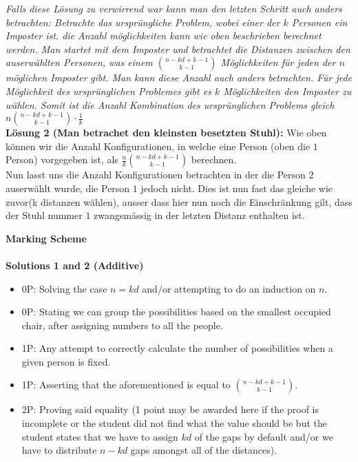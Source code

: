 {\emph{Falls diese Lösung zu verwirrend war kann man den letzten Schritt auch anders betrachten: Betrachte das ursprüngliche Problem, wobei einer der $k$ Personen ein Imposter ist. die Anzahl möglichkeiten kann wie oben beschrieben berechnet werden. Man startet mit dem Imposter und betrachtet die Distanzen zwischen den auserwählten Personen, was einem $\binom{n-kd+k-1}{k-1}$ Möglichkeiten für  jeden der $n$ möglichen Imposter gibt. Man kann diese Anzahl auch anders betrachten. Für jede Möglichkeit des ursprünglichen Problemes gibt es $k$ Möglichkeiten den Imposter zu wählen. Somit ist die Anzahl Kombination des ursprünglichen Problems gleich $n\binom{n-kd+k-1}{k-1} \cdot \frac{1}{k}$}\\

\textbf{Lösung 2 (Man betrachet den kleinsten besetzten Stuhl):} Wie oben können wir die Anzahl Konfigurationen, in welche eine Person (oben die $1$ Person) vorgegeben ist, als $\frac{n}{k}\binom{n-kd+k-1}{k-1}$ berechnen.\\
Nun lasst uns die Anzahl Konfigurationen betrachten in der die Person $2$ auserwählt wurde, die Person $1$ jedoch nicht. Dies ist nun fast das gleiche wie zuvor(k distanzen wählen), ausser dass hier nun noch die Einschränkung gilt, dass der Stuhl nummer $1$ zwangsmässig in der letzten Distanz enthalten ist.

\newpage

\textbf{Marking Scheme}\\
  \\
 \textbf{Solutions 1 and 2 (Additive)} 
 
 \begin{itemize}
 \item 0P: Solving the case $n = kd$ and/or attempting to do an induction on $n$.
 \item 0P: Stating we can group the possibilities based on the smallest occupied chair, after assigning numbers to all the people.
     \item 1P: Any attempt to correctly calculate the number of possibilities when a given person is fixed.
     \item 1P: Asserting that the aforementioned is equal to $\binom{n-kd+k-1}{k-1}$.  
     \item 2P: Proving said equality (1 point may be awarded here if the proof is incomplete or the student did not find what the value should be but the student states that we have to assign $kd$ of the gaps by default and/or we have to distribute $n-kd$ gaps amongst all of the distances).
\end{itemize}

}

